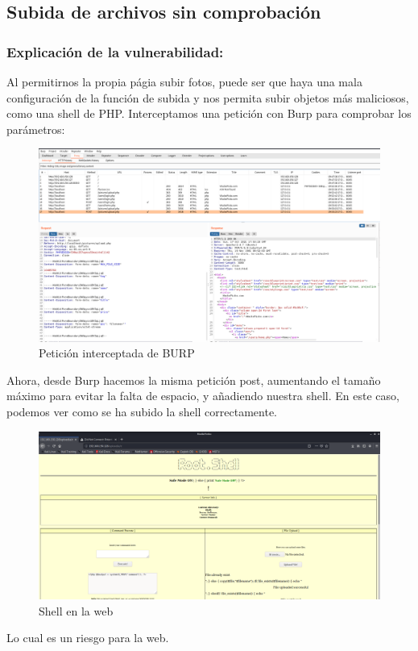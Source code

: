 \documentclass[12pt,twoside]{article}
\begin{document}
\subsection{Subida de archivos sin comprobación}
\subsubsection*{Explicación de la vulnerabilidad:}
Al permitirnos la propia págia subir fotos, puede ser que haya una mala configuración de la función de subida y nos permita subir objetos más maliciosos, como una shell de PHP. 
Interceptamos una petición con Burp para comprobar los parámetros:
\begin{figure}[H]
    \centering
    \includegraphics[scale=0.3]{./imagenes/burp_1}
    \caption{Petición interceptada de BURP}
\end{figure}

Ahora, desde Burp hacemos la misma petición post, aumentando el tamaño máximo para evitar la falta de espacio, y añadiendo nuestra shell. 
En este caso, podemos ver como se ha subido la shell correctamente.
\begin{figure}[H]
    \centering
    \includegraphics[scale=0.3]{./imagenes/burp_2}
    \caption{Shell en la web}
\end{figure}
Lo cual es un riesgo para la web. 
\end{document}
